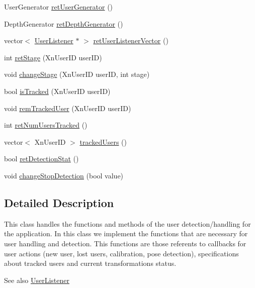 \begin{DoxyCompactItemize}
UserGenerator \hyperlink{classUserDetector_a48f939c3a179902b64a7cd3306ce1945}{retUserGenerator} ()
\item 
DepthGenerator \hyperlink{classUserDetector_a5d8f0abf78b9b9b9d3b028f99ffe7c2b}{retDepthGenerator} ()
\item 
vector$<$ \hyperlink{classUserListener}{UserListener} $\ast$ $>$ \hyperlink{classUserDetector_ab36f575abf375bed3f947f584576635f}{retUserListenerVector} ()
\item 
int \hyperlink{classUserDetector_abea25041679657598dcb9db7d9b9a9ec}{retStage} (XnUserID userID)
\item 
void \hyperlink{classUserDetector_a12b1f74ff23077f84c4c4bf01260e91b}{changeStage} (XnUserID userID, int stage)
\item 
bool \hyperlink{classUserDetector_a0df3aaf4a4034358934cbc4f057b5c8f}{isTracked} (XnUserID userID)
\item 
void \hyperlink{classUserDetector_a896c7f8c005eb192fe0337688c167ca6}{remTrackedUser} (XnUserID userID)
\item 
int \hyperlink{classUserDetector_a5cdce696a8c4064b34e1f7159921789f}{retNumUsersTracked} ()
\item 
vector$<$ XnUserID $>$ \hyperlink{classUserDetector_af00e561a7bac57f09c2a8c29d69d912a}{trackedUsers} ()
\item 
bool \hyperlink{classUserDetector_ac7b298a32601799b1750e8d5d72067fa}{retDetectionStat} ()
\item 
void \hyperlink{classUserDetector_ae0547a63d4a2d94663dd41ab347ffb2b}{changeStopDetection} (bool value)
\end{DoxyCompactItemize}


\subsection{Detailed Description}
This class handles the functions and methods of the user detection/handling for the application. In this class we implement the functions that are necessary for user handling and detection. This functions are those referents to callbacks for user actions (new user, lost users, calibration, pose detection), specifications about tracked users and current transformations status.

\begin{DoxySeeAlso}{See also}
\hyperlink{classUserListener}{UserListener} 
\end{DoxySeeAlso}


